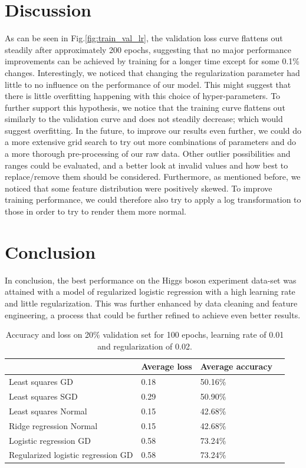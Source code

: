 \documentclass[10pt,conference,compsocconf]{IEEEtran}
\begin{document}
\section{Discussion}\label{sec: discussion}
As can be seen in Fig.\ref{fig:train_val_lr}, the validation loss curve flattens out steadily after approximately 200 epochs, suggesting that no major performance improvements can be achieved by training for a longer time except for some 0.1\% changes. Interestingly, we noticed that changing the regularization parameter had little to no influence on the performance of our model. This might suggest that there is little overfitting happening with this choice of hyper-parameters. To further support this hypothesis, we notice that the training curve flattens out similarly to the validation curve and does not steadily decrease; which would suggest overfitting. \newline
In the future, to improve our results even further, we could do a more extensive grid search to try out more combinations of parameters and do a more thorough pre-processing of our raw data. Other outlier possibilities and ranges could be evaluated, and a better look at invalid values and how best to replace/remove them should be considered. Furthermore, as mentioned before, we noticed that some feature distribution were positively skewed. To improve training performance, we could therefore also try to apply a log transformation to those in order to try to render them more normal. 
\section{Conclusion}\label{sec: conclusion}
In conclusion, the best performance on the Higgs boson experiment data-set was attained with a model of regularized logistic regression with a high learning rate and little regularization. This was further enhanced by data cleaning and feature engineering, a process that could be further refined to achieve even better results.  



\begin{table}[]
  \centering
  \begin{tabular}[c]{|l||l|l|l|}
    \hline
    &Average loss&Average accuracy \\
    \hline
    Least squares GD & 0.18 & 50.16\% \\
    Least squares SGD & 0.29 & 50.90\%\\
    Least squares Normal & 0.15 & 42.68\%\\
    Ridge regression Normal & 0.15 & 42.68\%\\
    Logistic regression GD & 0.58 & 73.24\%\\
    Regularized logistic regression GD & 0.58 & 73.24\% \\
    \hline
  \end{tabular}
  \caption{Accuracy and loss on 20\% validation set for 100 epochs, learning rate of 0.01 and regularization of 0.02. }
  \label{tab:basic_training}
\end{table}
\end{document}
